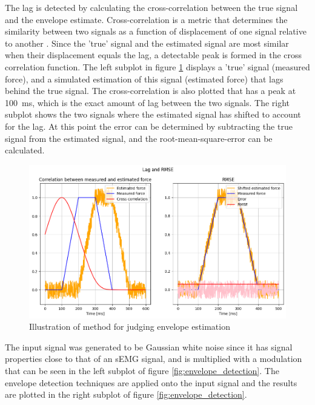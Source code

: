 The lag is detected by calculating the cross-correlation between the true signal and the envelope estimate. Cross-correlation is a metric that determines the similarity between two signals as a function of displacement of one signal relative to another \cite{wiki:cross_correlation}. Since the 'true' signal and the estimated signal are most similar when their displacement equals the lag, a detectable peak is formed in the cross correlation function. The left subplot in figure \ref{fig:envelope_estimation_method} displays a 'true' signal (measured force), and a simulated estimation of this signal (estimated force) that lags behind the true signal. The cross-correlation is also plotted that has a peak at \SI{100}{\milli\second}, which is the exact amount of lag between the two signals. The right subplot shows the two signals where the estimated signal has shifted to account for the lag. At this point the error can be determined by subtracting the true signal from the estimated signal, and the root-mean-square-error can be calculated. 

\begin{figure}[h!t]
	\begin{center}
		\includegraphics[width=1.0\columnwidth]{images/envelope_estimation_method.png}
	\end{center}
	\caption{Illustration of method for judging envelope estimation}
	\label{fig:envelope_estimation_method}
\end{figure}

The input signal was generated to be Gaussian white noise since it has signal properties close to that of an sEMG signal, and is multiplied with a modulation that can be seen in the left subplot of figure \ref{fig:envelope_detection}. The envelope detection techniques are applied onto the input signal and the results are plotted in the right subplot of figure \ref{fig:envelope_detection}.

